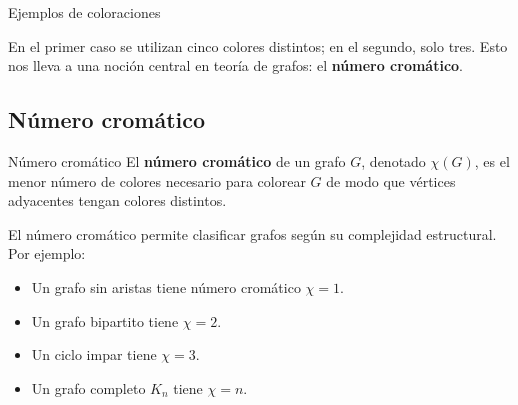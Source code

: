 \begin{exampleblock}{Ejemplos de coloraciones}
\begin{center}
\hspace{1cm}
\end{center}
\end{exampleblock}

En el primer caso se utilizan cinco colores distintos; en el segundo, solo tres. Esto nos lleva a una noción central en teoría de grafos: el \textbf{número cromático}.

\subsection{Número cromático}

\begin{definitionblock}{Número cromático}
El \textbf{número cromático} de un grafo \( G \), denotado \( \chi(G) \), es el menor número de colores necesario para colorear \( G \) de modo que vértices adyacentes tengan colores distintos.
\end{definitionblock}

\bigskip

El número cromático permite clasificar grafos según su complejidad estructural. Por ejemplo:

\begin{itemize}
  \item Un grafo sin aristas tiene número cromático \( \chi = 1 \).
  \item Un grafo bipartito tiene \( \chi = 2 \).
  \item Un ciclo impar tiene \( \chi = 3 \).
  \item Un grafo completo \( K_n \) tiene \( \chi = n \).
\end{itemize}


